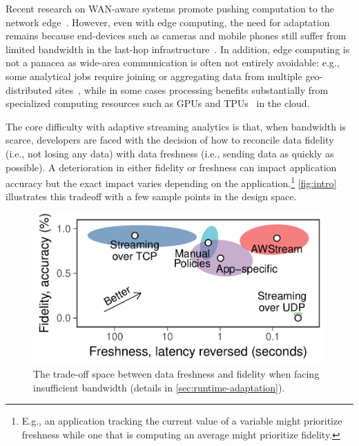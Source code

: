 Recent research on WAN-aware systems promote pushing computation to the network
edge~\cite{rabkin2014aggregation, satyanarayanan2009case}.  However, even with
edge computing, the need for adaptation remains because end-devices such as
cameras and mobile phones still suffer from limited bandwidth in the last-hop
infrastructure~\cite{abari2017enabling, zhang2015design}.  In addition, edge
computing is not a panacea as wide-area communication is often not entirely
avoidable: e.g., some analytical jobs require joining or aggregating data from
multiple geo-distributed sites~\cite{pu2015low, viswanathan2016clarinet}, while
in some cases processing benefits substantially from specialized computing
resources such as GPUs and TPUs~\cite{abadi2016tensorflow} in the cloud.

The core difficulty with adaptive streaming analytics is that, when bandwidth is
scarce, developers are faced with the decision of how to reconcile data fidelity
(i.e., not losing any data) with data freshness (i.e., sending data as quickly
as possible). A deterioration in either fidelity or freshness can impact
application accuracy but the exact impact varies depending on the
application.\footnote{E.g., an application tracking the current value of a
  variable might prioritize freshness while one that is computing an average
  might prioritize fidelity.}  \autoref{fig:intro} illustrates this tradeoff
with a few sample points in the design space.

\begin{figure}
  \centering
  \includegraphics[width=0.8\columnwidth]{figures/figure1.pdf}
  \caption{The trade-off space between data freshness and fidelity when facing
    insufficient bandwidth (details in \autoref{sec:runtime-adaptation}).}
  \label{fig:intro}
  \vspace{-0.5em}
\end{figure}

